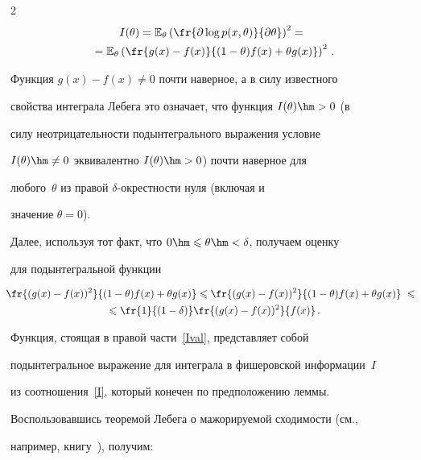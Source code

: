\begin{multicols}{2}
\begin{multline*}
I(\theta)=\E_\theta\left(\fr{\partial \log

p(x,\theta)}{\partial\theta}\right)^2={}\\

{}=\E_\theta\left(\fr{g(x)-f(x)}{(1-\theta)

f(x)+\theta g(x)}\right)^2\,.

\end{multline*}

Функция $g(x)-f(x)\neq0$ почти наверное, а в силу известного

свойства интеграла Лебега это означает, что функция $I(\theta)\hm>0$ (в

силу неотри\-ца\-тель\-ности подынтегрального выражения условие

$I(\theta)\hm\neq 0$ эквивалентно $I(\theta)\hm>0$) почти наверное для

любого~$\theta$ из правой $\delta$-окрест\-ности нуля (включая и

значение $\theta=0$).



Далее, используя тот факт, что $0\hm\leqslant\theta\hm<\delta$, получаем оценку

для подынтегральной функции

\begin{multline}

\label{Ival} 

\!\!\!\fr{(g(x)-f(x))^2}{(1-\theta) f(x)+\theta

g(x)}\leqslant\fr{(g(x)-f(x))^2}{(1-\theta) f(x)+\theta

g(x)}\;\leqslant\\

{}\leqslant \fr{1}{(1-\delta)}\fr{(g(x)-f(x))^2}{f(x)}\,.

\end{multline}



Функция, стоящая в правой части~\eqref{Ival}, пред\-став\-ля\-ет собой

подынтегральное выражение для интеграла в фишеровской информации~$I$ 

из соотношения~\eqref{I}, который конечен по предположению леммы.



Воспользовавшись теоремой Лебега о мажорируемой сходимости (см.,

например, книгу~\cite{KF1976}), получим:

\begin{multline*}


\end{multline*}
\end{multicols}
